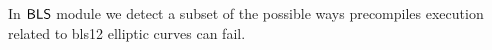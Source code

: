 In $\textsf{BLS}$ module we detect a subset of the possible ways precompiles execution related to bls12 elliptic curves can fail. 